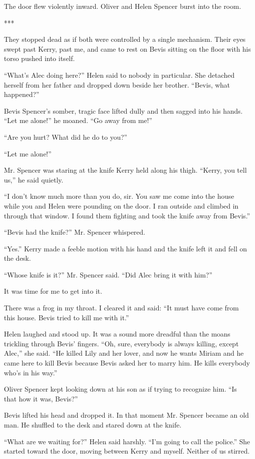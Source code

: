 {The door flew violently inward. Oliver and Helen Spencer burst into the room.

***

They stopped dead as if both were controlled by a single mechanism. Their eyes swept past Kerry, past me, and came to rest on Bevis sitting on the floor with his torso pushed into itself.

“What’s Alec doing here?” Helen said to nobody in particular. She detached herself from her father and dropped down beside her brother. “Bevis, what happened?”

Bevis Spencer’s somber, tragic face lifted dully and then sagged into his hands. “Let me alone!” he moaned. “Go away from me!”

“Are you hurt? What did he do to you?”

“Let me alone!”

Mr. Spencer was staring at the knife Kerry held along his thigh. “Kerry, you tell us,” he said quietly.

“I don’t know much more than you do, sir. You saw me come into the house while you and Helen were pounding on the door. I ran outside and climbed in through that window. I found them fighting and took the knife away from Bevis.”

“Bevis had the knife?” Mr. Spencer whispered.

“Yes.” Kerry made a feeble motion with his hand and the knife left it and fell on the desk.

“Whose knife is it?” Mr. Spencer said. “Did Alec bring it with him?”

It was time for me to get into it.

There was a frog in my throat. I cleared it and said: “It must have come from this house. Bevis tried to kill me with it.”

Helen laughed and stood up. It was a sound more dreadful than the moans trickling through Bevis’ fingers. “Oh, sure, everybody is always killing, except Alec,” she said. “He killed Lily and her lover, and now he wants Miriam and he came here to kill Bevis because Bevis asked her to marry him. He kills everybody who’s in his way.”

Oliver Spencer kept looking down at his son as if trying to recognize him. “Is that how it was, Bevis?”

Bevis lifted his head and dropped it. In that moment Mr. Spencer became an old man. He shuffled to the desk and stared down at the knife.

“What are we waiting for?” Helen said harshly. “I’m going to call the police.” She started toward the door, moving between Kerry and myself. Neither of us stirred.

}
